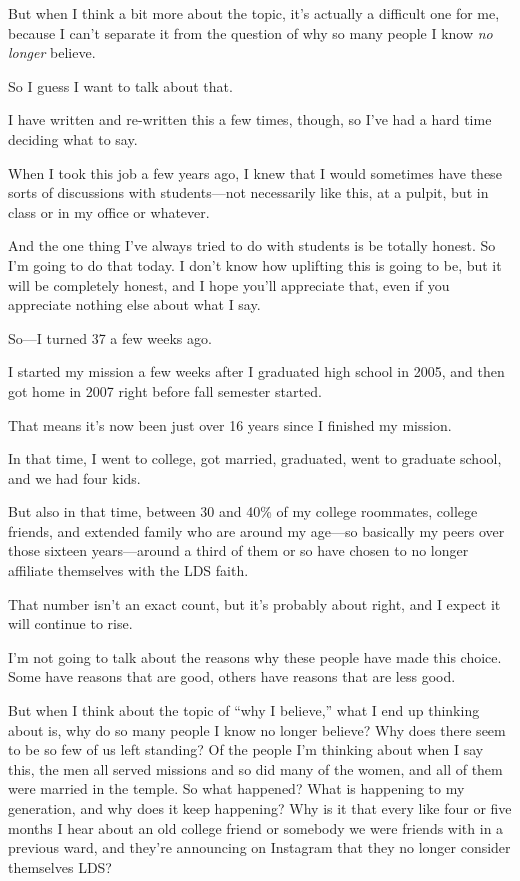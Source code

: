 \begin{compactitem}
			\item But when I think a bit more about the topic, it's actually a difficult one for me, because I can't separate it from the question of why so many people I know \textit{no longer} believe.
				\begin{compactitem}
					\item So I guess I want to talk about that.
					\item I have written and re-written this a few times, though, so I've had a hard time deciding what to say.
					\item When I took this job a few years ago, I knew that I would sometimes have these sorts of discussions with students---not necessarily like this, at a pulpit, but in class or in my office or whatever.
					\item And the one thing I've always tried to do with students is be totally honest. So I'm going to do that today. I don't know how uplifting this is going to be, but it will be completely honest, and I hope you'll appreciate that, even if you appreciate nothing else about what I say.
					\item So---I turned 37 a few weeks ago.
					\item I started my mission a few weeks after I graduated high school in 2005, and then got home in 2007 right before fall semester started.
					\item That means it's now been just over 16 years since I finished my mission.
					\item In that time, I went to college, got married, graduated, went to graduate school, and we had four kids.
					\item But also in that time, between 30 and 40\% of my college roommates, college friends, and extended family who are around my age---so basically my peers over those sixteen years---around a third of them or so have chosen to no longer affiliate themselves with the LDS faith.
					\item That number isn't an exact count, but it's probably about right, and I expect it will continue to rise.
					\item I'm not going to talk about the reasons why these people have made this choice. Some have reasons that are good, others have reasons that are less good.
					\item But when I think about the topic of ``why I believe,'' what I end up thinking about is, why do so many people I know no longer believe? Why does there seem to be so few of us left standing? Of the people I'm thinking about when I say this, the men all served missions and so did many of the women, and all of them were married in the temple. So what happened? What is happening to my generation, and why does it keep happening? Why is it that every like four or five months I hear about an old college friend or somebody we were friends with in a previous ward, and they're announcing on Instagram that they no longer consider themselves LDS?

\end{compactitem}
\end{compactitem}
